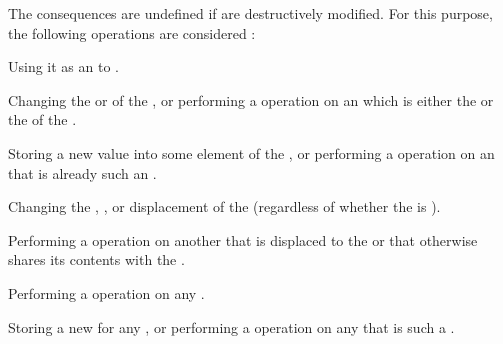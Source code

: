 

The consequences are undefined if   
are destructively modified.  For this purpose, the following operations 
are considered :

\beginlist



Using it as an  to .



Changing the  or  of the ,
or performing a  operation on an  which is either
the  or the  of the .



Storing a new value into some element of the ,
or performing a  operation 
on an  that is already such an .

Changing the , , or displacement of
the  (regardless of whether the  is ).

Performing a  operation on another  
that is displaced to the  or that otherwise shares its contents
with the .



Performing a  operation on any .

Storing a new  for any ,
or performing a  operation 
on any  that is such a .

